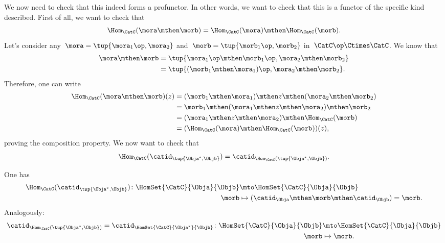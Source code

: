 
We now need to check that this indeed forms a profunctor.
In other words, we want to check that this is a functor of the specific kind described.
First of all, we want to check that
\begin{equation}
    \label{eq:hom5}
    \Hom_\CatC(\mora \mthen \morb)=\Hom_\CatC(\mora)\mthen \Hom_\CatC(\morb).
\end{equation}
Let's consider any~$\mora=\tup{\mora_1\op, \mora_2}$ and~$\morb=\tup{\morb_1\op,\morb_2}$ in~$\CatC\op \Ctimes \CatC$.
We know that
\begin{equation}
    \label{eq:hom6}
    \begin{aligned}
        \mora\mthen \morb&=\tup{\mora_1\op \mthen \morb_1\op, \mora_2\mthen \morb_2}\\
        &=\tup{(\morb_1\mthen \mora_1)\op, \mora_2\mthen \morb_2}.
    \end{aligned}
\end{equation}
Therefore, one can write
\begin{equation}
    \label{eq:hom7}
    \begin{aligned}
        \Hom_\CatC(\mora \mthen \morb)(z)&=(\morb_1\mthen \mora_1)\mthen z \mthen (\mora_2\mthen \morb_2)\\
        &=\morb_1\mthen (\mora_1\mthen z \mthen \mora_2) \mthen \morb_2\\
        &=(\mora_1\mthen z \mthen \mora_2)\mthen \Hom_\CatC(\morb)\\
        &=(\Hom_\CatC(\mora)\mthen \Hom_\CatC(\morb))(z),
    \end{aligned}
\end{equation}
proving the composition property.
We now want to check that
\begin{equation}
    \label{eq:hom_identity}
    \Hom_\CatC(\catid_{\tup{\Obja^*,\Objb}})=\catid_{\Hom_\CatC(\tup{\Obja^*,\Objb})}.
\end{equation}

One has
%
\begin{equation*}
    \begin{aligned}
        \Hom_\CatC(\catid_{\tup{\Obja^*,\Objb}})\colon \HomSet{\CatC}{\Obja}{\Objb}&\mto \HomSet{\CatC}{\Obja}{\Objb}\\
        \morb&\mapsto (\catid_\Obja \mthen \morb \mthen \catid_\Objb)=\morb.
    \end{aligned}
\end{equation*}
%
Analogously:
%
\begin{equation*}
    \begin{aligned}
        \catid_{\Hom_\CatC(\tup{\Obja^*,\Objb})}=\catid_{\HomSet{\CatC}{\Obja^*}{\Objb}} \colon \HomSet{\CatC}{\Obja}{\Objb}&\mto \HomSet{\CatC}{\Obja}{\Objb}\\
        \morb&\mapsto \morb.
    \end{aligned}
\end{equation*}

